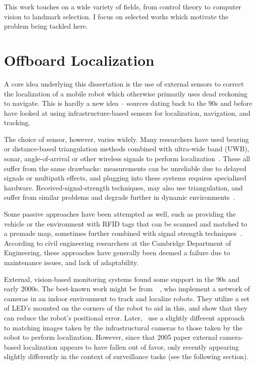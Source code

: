 \documentclass[a4paper,12pt,twoside,openright]{report}
\begin{document}

This work touches on a wide variety of fields, from control
theory to computer vision to landmark selection. I focus
on selected works which motivate the problem being tackled here.

\section{Offboard Localization}

A core idea underlying this dissertation is the use of
external sensors to correct the localization of a mobile robot which otherwise
primarily uses dead reckoning to navigate. 
This is hardly a new idea -- sources dating back to the 90s and before have looked at 
using infrastructure-based sensors for localization,
navigation, and tracking.

The choice of sensor, however, varies widely. Many researchers
have used bearing or distance-based triangulation methods combined
with ultra-wide band (UWB), sonar, angle-of-arrival or other wireless
signals to perform localization~\cite{wang2010survey}. These all suffer
from the same drawbacks: measurements can be unreliable
due to delayed signals or multipath effects, and plugging
into these systems requires specialized hardware. Received-signal-strength techniques, 
may also use triangulation, and suffer from similar problems and
degrade further in dynamic environments~\cite{goldoni2010experimental}.

Some passive approaches have been attempted as well, such as
providing the vehicle or the environment with RFID tags that
can be scanned and matched to a premade map, sometimes 
further combined with signal strength techniques~\cite{bouet2008rfid}. According to 
civil engineering researchers at the Cambridge Department of Engineering,
these approaches have generally been deemed a failure due to 
maintenance issues, and lack of adaptability. 

External, vision-based monitoring systems found some support
in the 90s and early 2000s. The best-known work might be
from~\citeauthor{kruse1998camera}~\cite{kruse1998camera}, who implement a network
of cameras in an indoor environment to track and localize robots.
They utilize a set of LED's mounted on the corners of the robot
to aid in this, and show that they can reduce the robot's
positional error. Later,~\citeauthor{menegatti2005distributed}\cite{menegatti2005distributed}
use a slightly different approach to matching images taken
by the infrastructural cameras to those taken by the robot to
perform localization. However, since that 2005 paper external 
camera-based localization appears to have fallen out of favor,
only recently appearing slightly differently
in the context of surveillance tasks (see the following section).
\end{document}

